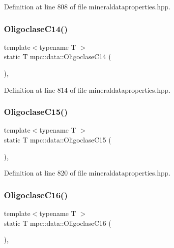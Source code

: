 Definition at line 808 of file mineraldataproperties.\+hpp.

\mbox{\label{namespacempc_1_1data_a67b0cc1dfb47b2061a5baf413dbc30c1}} 
\subsubsection{\texorpdfstring{Oligoclase\+C14()}{OligoclaseC14()}}
{\footnotesize\ttfamily template$<$typename T $>$ \\
static T mpc\+::data\+::\+Oligoclase\+C14 (\begin{DoxyParamCaption}{ }\end{DoxyParamCaption})\hspace{0.3cm}{\ttfamily [inline]}, {\ttfamily [static]}}



Definition at line 814 of file mineraldataproperties.\+hpp.

\mbox{\label{namespacempc_1_1data_abcbe10af9afd5b4426e95cc26205c611}} 
\subsubsection{\texorpdfstring{Oligoclase\+C15()}{OligoclaseC15()}}
{\footnotesize\ttfamily template$<$typename T $>$ \\
static T mpc\+::data\+::\+Oligoclase\+C15 (\begin{DoxyParamCaption}{ }\end{DoxyParamCaption})\hspace{0.3cm}{\ttfamily [inline]}, {\ttfamily [static]}}



Definition at line 820 of file mineraldataproperties.\+hpp.

\mbox{\label{namespacempc_1_1data_a01c1d37994926a3f583c3a09085e7dd7}} 
\subsubsection{\texorpdfstring{Oligoclase\+C16()}{OligoclaseC16()}}
{\footnotesize\ttfamily template$<$typename T $>$ \\
static T mpc\+::data\+::\+Oligoclase\+C16 (\begin{DoxyParamCaption}{ }\end{DoxyParamCaption})\hspace{0.3cm}{\ttfamily [inline]}, {\ttfamily [static]}}



